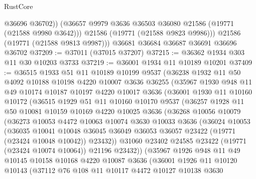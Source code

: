 \begin{lexlean}{RustCore}
\begin{coremodule}
            @36696
            @36702))
        (@36657 @9979 @3636 @36503 @36080 @21586 (@19771 (@21588 @9980 @3642)))
        @21586
        (@19771 (@21588 @9823 @9986)))
      @21586
      (@19771 (@21588 @9813 @9987)))
    @36681
    @36684
    @36687
    @36691
    @36696
    @36702
@37209 := @37011 (@37015 @37207)
@37215 := @36362 @1934 @303 @11 @30 @10203 @3733
@37219 := @36001 @1934 @11 @10189 @10201
@37409 := @36515
    @1933
    @51
    @11
    @10189
    @10199
    @9537
    (@36238
      @1932
      @11
      @50
      @4092
      @10188
      @10198
      @4220
      @10007
      @3636
      @36255
      (@35967
        @1930
        @948
        @11
        @49
        @10174
        @10187
        @10197
        @4220
        @10017
        @3636
        (@36001
          @1930
          @11
          @10160
          @10172
          (@36515
            @1929
            @51
            @11
            @10160
            @10170
            @9537
            (@36257
              @1928
              @11
              @50
              @10081
              @10159
              @10169
              @4220
              @10025
              @3636
              (@36268
                @10056
                @10079
                (@36273
                  @10053
                  @4472
                  @10063
                  @10074
                  @3630
                  @10033
                  @3636
                  (@36024
                    @10053
                    (@36035
                      @10041
                      @10048
                      @36045
                      @36049
                      @36053
                      @36057
                      @23422
                      (@19771 (@23424 @10048 @10042))
                      @23432))
                  @31060
                  @23402
                  @24585
                  @23422
                  (@19771 (@23424 @10074 @10064))
                  @21196
                  @23432))
              (@35967
                @1926
                @948
                @11
                @49
                @10145
                @10158
                @10168
                @4220
                @10087
                @3636
                (@36001
                  @1926
                  @11
                  @10120
                  @10143
                  (@37112
                    @76
                    @108
                    @11
                    @10117
                    @4472
                    @10127
                    @10138
                    @3630

\end{coremodule}
\end{lexlean}
